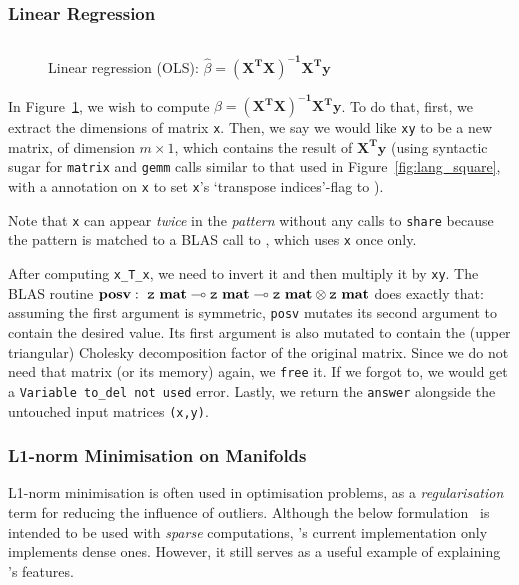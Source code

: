 \subsubsection{Linear Regression}

\begin{figure}[t]
    \centering
    \inputminted[fontsize=\small]{ocaml}{../../examples/lin_reg.lt}
    \caption{Linear regression (OLS): $\hat\beta =
        \mathbf{(X^T X)^{-1} X^T y}$}\label{fig:lang_lin_reg}
\end{figure}

In Figure~\ref{fig:lang_lin_reg}, we wish to compute $\hat\beta = \mathbf{(X^T
X)^{-1} X^T y}$. To do that, first, we extract the dimensions of matrix
\texttt{x}. Then, we say we would like \texttt{xy} to be a new matrix, of
dimension $m \times 1$, which contains the result of $\mathbf{X^T y}$ (using
syntactic sugar for \texttt{matrix} and \texttt{gemm} calls similar to that
used in Figure~\ref{fig:lang_square}, with a  annotation on
\texttt{x} to set \texttt{x}'s `transpose indices'-flag to ).

Note that \texttt{x} can appear \emph{twice} in the \emph{pattern} without any
calls to \texttt{share} because the pattern is matched to a BLAS call to
, which uses \texttt{x} once only.

After computing \texttt{x\_T\_x}, we need to invert it and then multiply it by
\texttt{xy}. The BLAS routine $\mathbf{posv}:\ {\texttt{z}\ \mathbf{mat}} \multimap
{\texttt{z}\ \mathbf{mat}} \multimap {\texttt{z}\ \mathbf{mat}} \otimes {\texttt{z}\ \mathbf{mat}}$ does
exactly that: assuming the first argument is symmetric, \texttt{posv} mutates
its second argument to contain the desired value. Its first argument is also
mutated to contain the (upper triangular) Cholesky decomposition factor of the
original matrix. Since we do not need that matrix (or its memory) again, we
\texttt{free} it. If we forgot to, we would get a \texttt{Variable to\_del not
used} error. Lastly, we return the \texttt{answer} alongside the untouched
input matrices \texttt{(x,y)}.

\subsubsection{L1-norm Minimisation on Manifolds}

L1-norm minimisation is often used in optimisation problems, as a
\emph{regularisation} term for reducing the influence of outliers.  Although
the below formulation~\cite{bronstein} is intended to be used with \emph{sparse}
computations, \lang's current implementation only implements dense ones.
However, it still serves as a useful example of explaining \lang's features.

